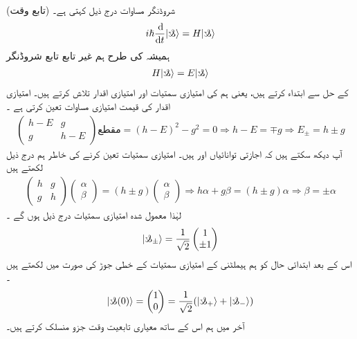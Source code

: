   \quad 
 (تابع  وقت)   شروڈنگر مساوات درج ذیل کہتی ہے۔ 
\begin{align}
i \hslash \frac{\dif}{\dif t} | \s \rangle = H | \s  \rangle
\end{align}
ہمیشہ کی طرح ہم  غیر تابع  تابع شروڈنگر
\begin{align}
H | \s \rangle = E | \s \rangle 
\end{align}
 کے  حل سے ابتداء کرتے ہیں،  یعنی ہم  کی امتیازی سمتیات اور امتیازی اقدار تلاش کرتے ہیں۔ امتیازی اقدار کی قیمت امتیازی مساوات تعین کرتی ہے ۔
\begin{align*}
 \begin{pmatrix} h-E & g \\ g & h-E \end{pmatrix}\text{مقطع} = (h-E)^{2} - g^{2} = 0 \Rightarrow h-E = \mp g \Rightarrow E_{\pm} = h \pm g
\end{align*}
آپ دیکھ سکتے ہیں کہ اجازتی  توانائیاں  اور  ہیں۔ امتیازی سمتیات  تعین کرنے کی خاطر ہم درج ذیل لکھتے ہیں 
\begin{align*}
\begin{pmatrix} h & g \\ g & h  \end{pmatrix} \begin{pmatrix}
 \alpha \\ \beta \end{pmatrix} = (h\pm g) \begin{pmatrix} \alpha \\ \beta  \end{pmatrix} \Rightarrow h\alpha + g\beta = (h\pm g) \alpha \Rightarrow \beta = \pm \alpha
\end{align*}
لہٰذا معمول شدہ امتیازی سمتیات درج ذیل ہوں گے ۔
\begin{align*}
| \s _{\pm} \rangle = \frac{1}{\sqrt{2}} \begin{pmatrix} 1 \\ \pm 1 \end{pmatrix}
\end{align*}
اس کے بعد ابتدائی حال کو ہم ہیملٹنی کے امتیازی سمتیات کے خطی جوڑ کی صورت میں لکھتے ہیں ۔
\begin{align*}
| \s (0) \rangle = \begin{pmatrix} 1 \\ 0  \end{pmatrix} = \frac{1}{\sqrt{2}} ( | \s_{+} \rangle + | \s_{-} \rangle )
\end{align*}
آخر میں ہم اس کے ساتھ معیاری تابعیت  وقت جزو   منسلک کرتے ہیں۔ 
